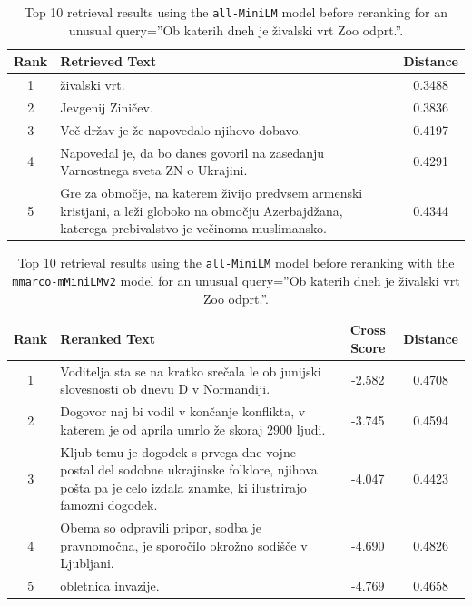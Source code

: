 \documentclass[conference]{IEEEtran}
\begin{document}
\begin{table}
\centering
\small
\begin{tabular}{|c|p{12cm}|c|}
\hline
\textbf{Rank} & \textbf{Retrieved Text} & \textbf{Distance} \\
\hline
1 & živalski vrt. & 0.3488 \\
\hline
2 & Jevgenij Ziničev. & 0.3836 \\
\hline
3 & Več držav je že napovedalo njihovo dobavo. & 0.4197 \\
\hline
4 & Napovedal je, da bo danes govoril na zasedanju Varnostnega sveta ZN o Ukrajini. & 0.4291 \\
\hline
5 & Gre za območje, na katerem živijo predvsem armenski kristjani, a leži globoko na območju Azerbajdžana, katerega prebivalstvo je večinoma muslimansko. & 0.4344 \\
\hline
\end{tabular}
\caption{Top 10 retrieval results using the \texttt{all-MiniLM} model before reranking for an unusual query=''Ob katerih dneh je živalski vrt Zoo odprt.''.}
\label{tab:unusual_query}
\end{table}


\begin{table}
\centering
\small
\begin{tabular}{|c|p{12cm}|c|c|}
\hline
\textbf{Rank} & \textbf{Reranked Text} & \textbf{Cross Score} & \textbf{Distance} \\
\hline
1 & Voditelja sta se na kratko srečala le ob junijski slovesnosti ob dnevu D v Normandiji. & -2.582 & 0.4708 \\
\hline
2 & Dogovor naj bi vodil v končanje konflikta, v katerem je od aprila umrlo že skoraj 2900 ljudi. & -3.745 & 0.4594 \\
\hline
3 & Kljub temu je dogodek s prvega dne vojne postal del sodobne ukrajinske folklore, njihova pošta pa je celo izdala znamke, ki ilustrirajo famozni dogodek. & -4.047 & 0.4423 \\
\hline
4 & Obema so odpravili pripor, sodba je pravnomočna, je sporočilo okrožno sodišče v Ljubljani. & -4.690 & 0.4826 \\
\hline
5 & obletnica invazije. & -4.769 & 0.4658 \\
\hline
\end{tabular}
\caption{Top 10 retrieval results using the \texttt{all-MiniLM} model before reranking with the \texttt{mmarco-mMiniLMv2} model for an unusual query=''Ob katerih dneh je živalski vrt Zoo odprt.''.}
\label{tab:unusual_query_reranked}
\end{table}
\end{document}

